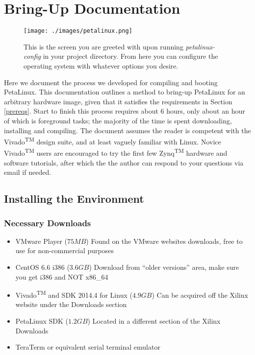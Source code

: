 \chapter{Bring-Up Documentation}
\label{bringupdoc}
\begin{figure}[H]
\centering
\texttt{[image: ./images/petalinux.png]}
\caption[PetaLinux Config Screen]{This is the screen you are greeted with upon running \textit{petalinux-config} in your project directory. From here you can configure the operating system with whatever options you desire.}
\label{petalinux}
\end{figure}
Here we document the process we developed for compiling and booting PetaLinux. This documentation outlines a method to bring-up PetaLinux for an arbitrary hardware image, given that it satisfies the requirements in Section \ref{prereqs}. Start to finish this process requires about 6 hours, only about an hour of which is foreground tasks; the majority of the time is spent downloading, installing and compiling. The document assumes the reader is competent with the Vivado\textsuperscript{TM} design suite, and at least vaguely familiar with Linux. Novice Vivado\textsuperscript{TM} users are encouraged to try the first few Zynq\textsuperscript{TM} hardware and software tutorials, after which the the author can respond to your questions via email if needed. %
\section{Installing the Environment}
\subsection{Necessary Downloads}
\begin{itemize}
\item VMware Player ($75 MB$)
\subitem Found on the VMware websites downloads, free to use for non-commercial purposes
\item CentOS 6.6 i386 ($3.6 GB$)
\subitem Download from ``older versions'' area, make sure you get i386 and NOT x86\_64
\item Vivado\textsuperscript{TM} and SDK 2014.4 for Linux ($4.9 GB$)
\subitem Can be acquired off the Xilinx website under the Downloads section
\item PetaLinux SDK ($1.2 GB$)
\subitem Located in a different section of the Xilinx Downloads
\item TeraTerm or equivalent serial terminal emulator
\end{itemize}

